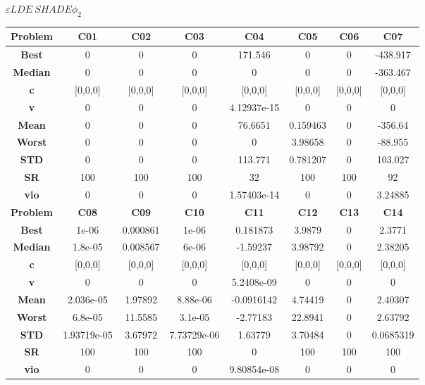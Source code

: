 \documentclass{IEEEtran}
\begin{document}
\begin{center}
$\varepsilon LDE\ SHADE \phi_2$\\
  \begin{tabular}{|c|c|c|c|c|c|c|c|}
    \hline 
    \textbf{Problem} & \textbf{C01} & \textbf{C02} & \textbf{C03} & \textbf{C04} & \textbf{C05} & \textbf{C06} & \textbf{C07} \\ 
    \hline\hline 
    \textbf{Best} & 0 & 0 & 0 & 171.546 & 0 & 0 & -438.917\\ 
    \textbf{Median} & 0 & 0 & 0 & 0 & 0 & 0 & -363.467\\ 
    \textbf{c} & [0,0,0] & [0,0,0] & [0,0,0] & [0,0,0] & [0,0,0] & [0,0,0] & [0,0,0]\\ 
    \textbf{v} & 0 & 0 & 0 & 4.12937e-15 & 0 & 0 & 0\\ 
    \textbf{Mean} & 0 & 0 & 0 & 76.6651 & 0.159463 & 0 & -356.64\\ 
    \textbf{Worst} & 0 & 0 & 0 & 0 & 3.98658 & 0 & -88.955\\ 
    \textbf{STD} & 0 & 0 & 0 & 113.771 & 0.781207 & 0 & 103.027\\ 
    \textbf{SR} & 100 & 100 & 100 & 32 & 100 & 100 & 92\\ 
    \textbf{vio} & 0 & 0 & 0 & 1.57403e-14 & 0 & 0 & 3.24885\\ 
    \hline 
    \hline 
    \textbf{Problem} & \textbf{C08} & \textbf{C09} & \textbf{C10} & \textbf{C11} & \textbf{C12} & \textbf{C13} & \textbf{C14} \\ 
    \hline\hline 
    \textbf{Best} & 1e-06 & 0.000861 & 1e-06 & 0.181873 & 3.9879 & 0 & 2.3771\\ 
    \textbf{Median} & 1.8e-05 & 0.008567 & 6e-06 & -1.59237 & 3.98792 & 0 & 2.38205\\ 
    \textbf{c} & [0,0,0] & [0,0,0] & [0,0,0] & [0,0,0] & [0,0,0] & [0,0,0] & [0,0,0]\\ 
    \textbf{v} & 0 & 0 & 0 & 5.2408e-09 & 0 & 0 & 0\\ 
    \textbf{Mean} & 2.036e-05 & 1.97892 & 8.88e-06 & -0.0916142 & 4.74419 & 0 & 2.40307\\ 
    \textbf{Worst} & 6.8e-05 & 11.5585 & 3.1e-05 & -2.77183 & 22.8941 & 0 & 2.63792\\ 
    \textbf{STD} & 1.93719e-05 & 3.67972 & 7.73729e-06 & 1.63779 & 3.70484 & 0 & 0.0685319\\ 
    \textbf{SR} & 100 & 100 & 100 & 0 & 100 & 100 & 100\\ 
    \textbf{vio} & 0 & 0 & 0 & 9.80854e-08 & 0 & 0 & 0\\ 

\end{tabular}
\end{center}
\end{document}
